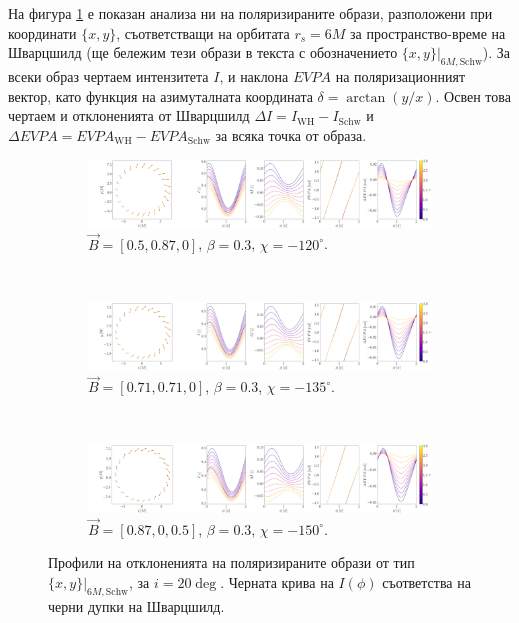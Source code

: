 На фигура \ref{WH_delta_r6} е показан анализа ни на поляризираните образи, разположени при координати $\{x,y\}$, съответстващи на орбитата $r_s = 6M$ за пространство-време на Шварцшилд (ще бележим тези образи в текста с обозначението $\{x,y\}\vert_{6M, \text{Schw}}$). За всеки образ чертаем интензитета $I$, и наклона $EVPA$ на поляризационният вектор, като функция на азимуталната координата $\delta = \arctan(y / x)$. Освен това чертаем и отклоненията от Шварцшилд $\Delta I = I_{\text{WH}} - I_{\text{Schw}}$ и $\Delta EVPA = EVPA_\text{WH} - EVPA_\text{Schw}$ за всяка точка от образа.

\begin{figure}[!htb]
	\begin{subfigure}{12cm}
		\hspace{-0.5cm}
		\includegraphics[scale = 0.13]{WH_delta_fig_B_0.5_0.87_0_20_deg_r6.png}
		\caption{$\vec{B} = [0.5, 0.87, 0]$, $\beta = 0.3$, $\chi = -120^\circ$.} 
	\end{subfigure}\\
	\begin{subfigure}{12cm}
		\hspace{-0.5cm}
		\includegraphics[scale = 0.13]{WH_delta_fig_B_0.71_0.71_0_20_deg_r6.png}
		\caption{$\vec{B} = [0.71, 0.71, 0]$, $\beta = 0.3$, $\chi = -135^\circ$.}
	\end{subfigure}\\
	\begin{subfigure}{12cm}
		\hspace{-0.5cm}
		\includegraphics[scale = 0.13]{WH_delta_fig_B_0.87_0.5_0_20_deg_r6.png}
		\caption{$\vec{B} = [0.87, 0, 0.5]$, $\beta = 0.3$, $\chi = -150^\circ$.}
	\end{subfigure}
	\caption[Профили на отклоненията на поляризираните образи oт тип $\{x,y\}\vert_{6M, \text{Schw}}$, за $i = 20\deg$.]{\small Профили на отклоненията на поляризираните образи от тип $\{x,y\}\vert_{6M, \text{Schw}}$, за $i = 20\deg$. Черната крива на $I(\phi)$ съответства на черни дупки на Шварцшилд.} 
	\label{WH_delta_r6}
\end{figure}

